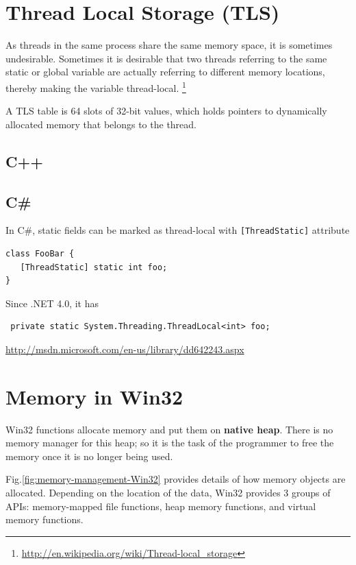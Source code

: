 \section{Thread Local Storage (TLS)}
\label{sec:TLS}

As threads in the same process share the same memory space, it is sometimes
undesirable. Sometimes it is desirable that two threads referring to the same
static or global variable are actually referring to different memory locations,
thereby making the variable thread-local.
\footnote{\url{http://en.wikipedia.org/wiki/Thread-local_storage}}

A TLS table is 64 slots of 32-bit values, which holds pointers to dynamically
allocated memory that belongs to the thread.


\subsection{C++}

\subsection{C\#}

In C\#, static fields can be marked as thread-local with \verb![ThreadStatic]!
attribute
\begin{verbatim}
class FooBar {
   [ThreadStatic] static int foo;
}
\end{verbatim}

Since .NET 4.0, it has
\begin{verbatim}
 private static System.Threading.ThreadLocal<int> foo;
\end{verbatim}
\url{http://msdn.microsoft.com/en-us/library/dd642243.aspx}


\section{Memory in Win32}
\label{sec:memory-Win32}

Win32 functions allocate memory and put them on {\bf native heap}. There is no
memory manager for this heap; so it is the task of the programmer to free the
memory once it is no longer being used.

Fig.\ref{fig:memory-management-Win32} provides details of how memory objects are
allocated. Depending on the location of the data, Win32 provides 3 groups of
APIs: memory-mapped file functions, heap memory functions, and virtual memory
functions.

